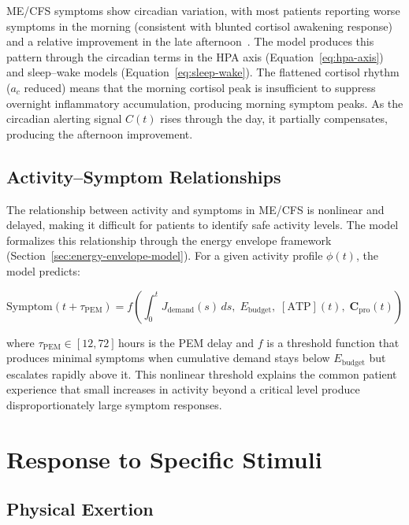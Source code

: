 ME/CFS symptoms show circadian variation, with most patients reporting worse symptoms in the morning (consistent with blunted cortisol awakening response) and a relative improvement in the late afternoon~\cite{cambras2018circadian}. The model produces this pattern through the circadian terms in the HPA axis (Equation~\ref{eq:hpa-axis}) and sleep--wake models (Equation~\ref{eq:sleep-wake}). The flattened cortisol rhythm ($a_c$ reduced) means that the morning cortisol peak is insufficient to suppress overnight inflammatory accumulation, producing morning symptom peaks. As the circadian alerting signal $C(t)$ rises through the day, it partially compensates, producing the afternoon improvement.

\subsection{Activity--Symptom Relationships}
\label{sec:activity-symptom}

The relationship between activity and symptoms in ME/CFS is nonlinear and delayed, making it difficult for patients to identify safe activity levels. The model formalizes this relationship through the energy envelope framework (Section~\ref{sec:energy-envelope-model}). For a given activity profile $\phi(t)$, the model predicts:

\begin{equation}
\label{eq:activity-symptom}
\text{Symptom}(t + \tau_{\text{PEM}}) = f\left( \int_0^t J_{\text{demand}}(s) \, ds, \; E_{\text{budget}}, \; [\text{ATP}](t), \; \boldsymbol{C}_{\text{pro}}(t) \right)
\end{equation}

where $\tau_{\text{PEM}} \in [12, 72]$\,hours is the PEM delay and $f$ is a threshold function that produces minimal symptoms when cumulative demand stays below $E_{\text{budget}}$ but escalates rapidly above it. This nonlinear threshold explains the common patient experience that small increases in activity beyond a critical level produce disproportionately large symptom responses.

\section{Response to Specific Stimuli}
\label{sec:stimuli-response}

\subsection{Physical Exertion}
\label{sec:physical-exertion-response}

